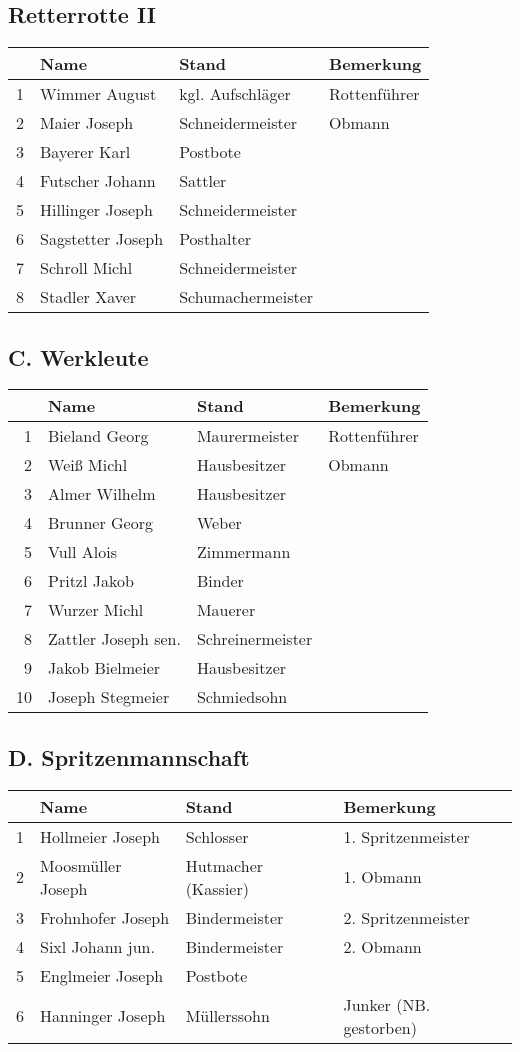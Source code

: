 \documentclass[12pt,a4paper]{book}
\begin{document}
\subsection*{Retterrotte II}

\begin{tabular}{rlll}
& Name & Stand & Bemerkung\\
\hline
1 & Wimmer August & kgl. Aufschläger & Rottenführer\\
2 & Maier Joseph & Schneidermeister & Obmann\\
3 & Bayerer Karl & Postbote\\
4 & Futscher Johann & Sattler\\
5 & Hillinger Joseph & Schneidermeister\\
6 & Sagstetter Joseph & Posthalter\\
7 & Schroll Michl & Schneidermeister\\
8 & Stadler Xaver & Schumachermeister\\
\end{tabular}

\subsection*{C. Werkleute}

\begin{tabular}{rlll}
& Name & Stand & Bemerkung\\
\hline
1 & Bieland Georg & Maurermeister & Rottenführer\\
2 & Weiß Michl & Hausbesitzer & Obmann\\
3 & Almer Wilhelm & Hausbesitzer\\
4 & Brunner Georg & Weber\\
5 & Vull Alois & Zimmermann\\
6 & Pritzl Jakob & Binder\\
7 & Wurzer Michl & Mauerer\\
8 & Zattler Joseph sen. & Schreinermeister\\
9 & Jakob Bielmeier & Hausbesitzer\\
10 & Joseph Stegmeier & Schmiedsohn\\
\end{tabular}

\subsection*{D. Spritzenmannschaft}

\begin{tabular}{rlll}
& Name & Stand & Bemerkung\\
\hline
1 & Hollmeier Joseph & Schlosser & 1. Spritzenmeister\\
2 & Moosmüller Joseph & Hutmacher (Kassier) & 1. Obmann\\
3 & Frohnhofer Joseph & Bindermeister & 2. Spritzenmeister\\
4 & Sixl Johann jun. & Bindermeister & 2. Obmann\\
5 & Englmeier Joseph & Postbote\\
6 & Hanninger Joseph & Müllerssohn & Junker (NB. gestorben)\\
\end{tabular}
\end{document}
